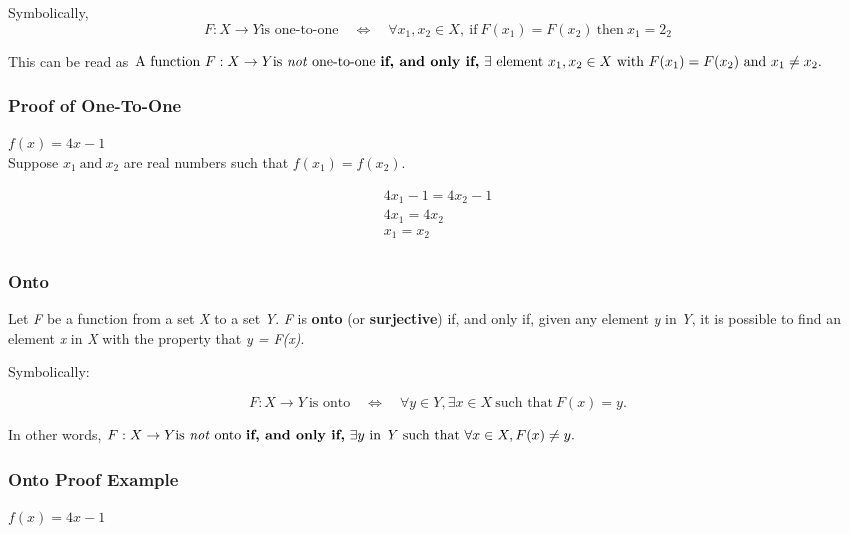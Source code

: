 \documentclass[12pt]{article}
\begin{document}
Symbolically,
\begin{equation*}
F: X \rightarrow Y \text{is one-to-one} \quad \Leftrightarrow \quad \forall x_1, x_2 \in X, \ \text{if} \ F(x_1) = F(x_2) \ \text{then} \ x_1 = 2_2
\end{equation*}

This can be read as $\text{A function} \ F: X \rightarrow Y \text{is \textit{not} one-to-one} \ \text{\textbf{if, and only if,}} \ \exists \ \text{element} \ x_1, x_2 \in X \ \text{with} \ F(x_1) = F(x_2) \ \text{and} \ x_1 \neq x_2.$

\subsubsection*{Proof of One-To-One}
$f(x) = 4x - 1$ \\

\noindent
Suppose $x_1 \ \text{and} \ x_2$ are real numbers such that $f(x_1) = f(x_2)$.

\begin{align}
4x_1 - 1 = 4x_2 - 1 \\
4x_1 = 4x_2 \\
x_1 = x_2 \\
\end{align}

\subsubsection*{Onto}
Let \textit{F} be a function from a set \textit{X} to a set \textit{Y}. \textit{F} is \textbf{onto} (or \textbf{surjective}) if, and only if, given any element \textit{y} in \textit{Y}, it is possible to find an element \textit{x} in \textit{X} with the property that \textit{y = F(x)}.

Symbolically:

\begin{equation*}
F: X \rightarrow Y \ \text{is onto} \quad \Leftrightarrow \quad \forall y \in Y, \exists x \in X \ \text{such that} \ F(x) = y.
\end{equation*}

In other words, $F: X \rightarrow Y \text{is \textit{not} onto} \ \text{\textbf{if, and only if,}} \ \exists y \ \text{in \textit{Y} such that} \ \forall x \in X, F(x) \neq y.$

\subsubsection*{Onto Proof Example}
$f(x) = 4x - 1$
\end{document}
